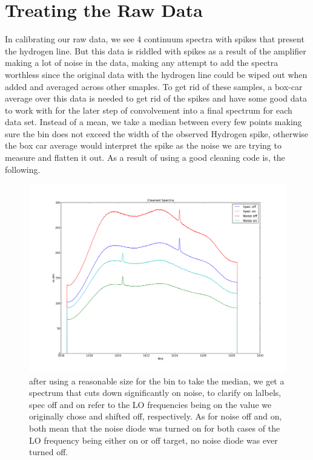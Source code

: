 \documentclass[12 pt]{article}
\begin{document}
\section*{Treating the Raw Data}
In calibrating our raw data, we see 4 continuum spectra
with spikes that present the hydrogen line. But this data is riddled
with spikes as a result of the amplifier making a lot of noise in the
data, making any attempt to add the spectra worthless since the original
data with the hydrogen line could be wiped out when added and averaged
across other smaples. To get rid of these samples, a box-car average
over this data is needed to get rid of the spikes and have some good
data to work with for the later step of convolvement into a final
spectrum for each data set. Instead of a mean, we take a median between
every few points making sure the bin does not exceed the width of the
observed Hydrogen spike, otherwise the box car average would interpret
the spike as the noise we are trying to measure and flatten it out. As a
result of using a good cleaning code is, the following. 
\begin{figure}[H]
\centering
\includegraphics[scale = 0.45]{cleandata.png}
\caption{after using a reasonable size for the bin to take the median,
  we get a spectrum that cuts down significantly on noise, to clarify on
lalbels, spec off and on refer to the LO frequencies being on the value
we originally chose and shifted off, respectively. As for noise off and
on, both mean that the noise diode was turned on for both cases of the
LO frequency being either on or off target,  no noise diode was ever
turned off.}
\label{cleandata}
\end{figure}
\end{document}
